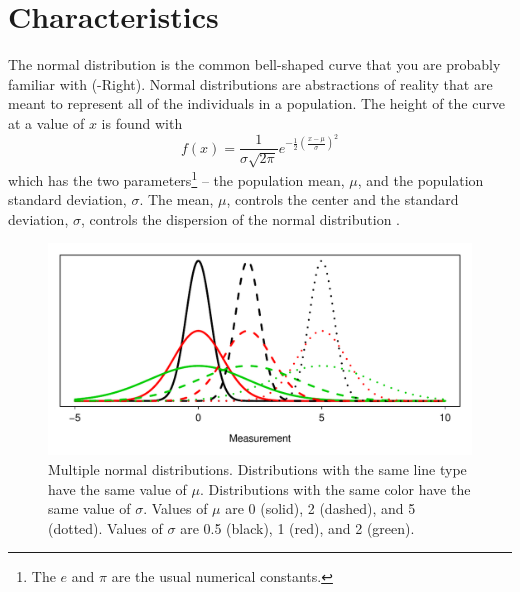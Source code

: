 \documentclass[10pt,openany]{book}\usepackage[]{graphicx}\usepackage[]{color}
\newenvironment{knitrout}{}{} %
\begin{document}
\section{Characteristics}
The normal distribution is the common bell-shaped curve that you are probably familiar with (-Right).  Normal distributions are abstractions of reality that are meant to represent all of the individuals in a population.  The height of the curve at a value of $x$ is found with
\begin{equation}
  \label{eqn:NormDistfx}
    f(x) = \frac{1}{\sigma\sqrt{2\pi}}e^{-\frac{1}{2}\left(\frac{x-\mu}{\sigma}\right)^{2}}
\end{equation}
which has the two parameters\footnote{The $e$ and $\pi$ are the usual numerical constants.} -- the population mean, $\mu$, and the population standard deviation, $\sigma$.  The mean, $\mu$, controls the center and the standard deviation, $\sigma$, controls the dispersion of the normal distribution .

\begin{knitrout}
\color{fgcolor}\begin{figure}[hbtp]

{\centering \includegraphics[width=.8\linewidth]{Figs/NormMultDists-1} 

}

\caption[Multiple normal distributions]{Multiple normal distributions.  Distributions with the same line type have the same value of $\mu$.  Distributions with the same color have the same value of $\sigma$.  Values of $\mu$ are 0 (solid), 2 (dashed), and 5 (dotted).  Values of $\sigma$ are 0.5 (black), 1 (red), and 2 (green).}\label{fig:NormMultDists}
\end{figure}


\end{knitrout}
\end{document}

